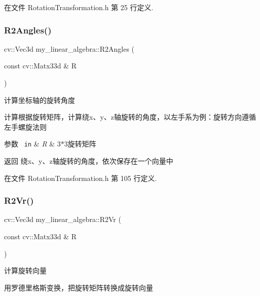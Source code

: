在文件 Rotation\+Transformation.\+h 第 25 行定义.

\mbox{\label{namespacemy__linear__algebra_a362b45c147136aa0f1045200545cb38a}} 
\subsubsection{\texorpdfstring{R2Angles()}{R2Angles()}}
{\footnotesize\ttfamily cv\+::\+Vec3d my\+\_\+linear\+\_\+algebra\+::\+R2\+Angles (\begin{DoxyParamCaption}\item[{const cv\+::\+Matx33d \&}]{R }\end{DoxyParamCaption})}



计算坐标轴的旋转角度 

计算根据旋转矩阵，计算绕x、y、z轴旋转的角度，以左手系为例：旋转方向遵循左手螺旋法则


\begin{DoxyParams}[1]{参数}
\mbox{\texttt{ in}}  & {\em R} & 3$\ast$3旋转矩阵 \\
\hline
\end{DoxyParams}
\begin{DoxyReturn}{返回}
绕x、y、z轴旋转的角度，依次保存在一个向量中 
\end{DoxyReturn}


在文件 Rotation\+Transformation.\+h 第 105 行定义.

\mbox{\label{namespacemy__linear__algebra_acd3b6b29042ea3d6ceafc74ace2975ce}} 
\subsubsection{\texorpdfstring{R2Vr()}{R2Vr()}}
{\footnotesize\ttfamily cv\+::\+Vec3d my\+\_\+linear\+\_\+algebra\+::\+R2\+Vr (\begin{DoxyParamCaption}\item[{const cv\+::\+Matx33d \&}]{R }\end{DoxyParamCaption})}



计算旋转向量 

用罗德里格斯变换，把旋转矩阵转换成旋转向量


